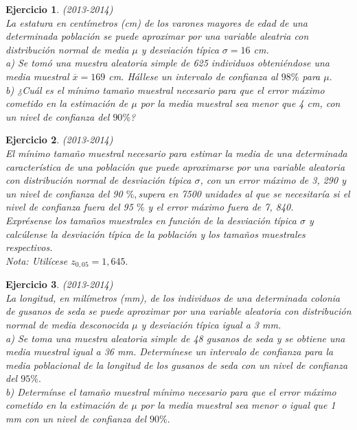 \documentclass[12pt, a4paper]{amsart}
\newtheorem{ejer}{Ejercicio}
\begin{document}
\begin{ejer}\em (2013-2014)\\
La estatura en centímetros (cm) de los varones mayores de edad de una determinada población se puede aproximar por una variable aleatria con distribución normal de media $\mu$ y desviación típica $\sigma=16$ cm.\\
a) Se tomó una muestra aleatoria simple de 625 individuos obteniéndose una media muestral $\overline{x}=169$ cm. Hállese un intervalo de confianza al $98\%$ para $\mu.$\\
b) ¿Cuál es el mínimo tamaño muestral necesario para que el error máximo cometido en la estimación de $\mu$ por la media muestral sea menor que 4 cm, con un nivel de confianza del $90\%$?
\end{ejer}

\begin{ejer}\em (2013-2014)\\
El mínimo tamaño muestral necesario para estimar la media de una determinada característica de una
población que puede aproximarse por una variable aleatoria con distribución normal de desviación típica
$\sigma$, con un error máximo de 3, 290 y un nivel de confianza del 90 $\%,$supera en 7500 unidades al que se
necesitaría si el nivel de confianza fuera del 95 $\%$ y el error máximo fuera de 7, 840.\\
Exprésense los tamaños muestrales en función de la desviación típica $\sigma$  y calcúlense la desviación típica de
la población y los tamaños muestrales respectivos.\\
Nota: Utilícese $z_{0,05} = 1, 645.$
\end{ejer}

\begin{ejer}\em (2013-2014)\\
La longitud, en milímetros (mm), de los individuos de una determinada colonia de gusanos de seda se puede aproximar por una variable aleatoria con distribución normal de media desconocida $\mu$ y desviación típica igual a 3 mm.\\
a) Se toma una muestra aleatoria simple de 48 gusanos de seda y se obtiene una media muestral igual a 36 mm. Determínese un intervalo de confianza para la media poblacional de la longitud de los gusanos de seda con un nivel de confianza del $95\%.$\\
b) Determínse el tamaño muestral mínimo necesario para que el error máximo cometido en la estimación de $\mu$ por la media muestral sea menor o igual que 1 mm con un nivel de confianza del $90\%.$
\end{ejer}
\end{document}
